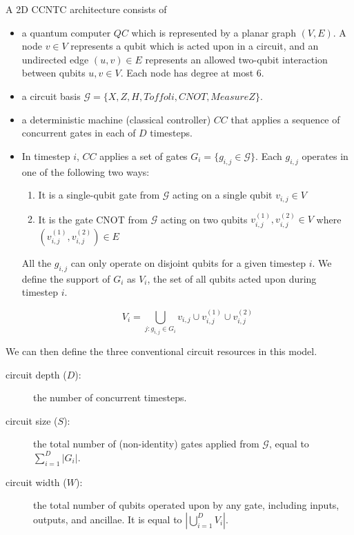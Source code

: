 \begin{definition}
A \textsf{2D CCNTC} architecture consists of

\begin{itemize}
\item a quantum computer $QC$ which is represented by a planar graph $(V,E)$. A
node $v \in V$ represents a qubit which is acted upon in a circuit, and an
undirected edge $(u,v) \in E$ represents 
an allowed two-qubit interaction between qubits $u,v \in V$. Each node has
degree at most $6$.
\item a circuit basis $\mathcal{G} = \{X, Z, H, Toffoli, CNOT, MeasureZ\}$.

\item a deterministic machine (classical controller) $CC$ that applies a sequence
of concurrent gates in each of $D$ timesteps.
\item In timestep $i$, $CC$ applies a set of
gates $G_i = \{g_{i,j} \in \mathcal{G} \}$.
Each $g_{i,j}$ operates in one of the following two ways:
\begin{enumerate}
\item It is a single-qubit gate from $\mathcal{G}$ acting on a single qubit $v_{i,j} \in V$
\item
It is the gate CNOT from $\mathcal{G}$ acting on two qubits $v^{(1)}_{i,j}, v^{(2)}_{i,j} \in V$ where
$\left(v^{(1)}_{i,j}, v^{(2)}_{i,j}\right) \in E$
\end{enumerate}
All the $g_{i,j}$ can only operate on
disjoint qubits for a given timestep $i$. We define the support of $G_i$
as $V_i$, the set of all qubits acted upon during timestep $i$.

\begin{equation}
V_i = \bigcup_{j: g_{i,j} \in G_i} v_{i,j} \cup v^{(1)}_{i,j} \cup v^{(2)}_{i,j}
\end{equation}

\end{itemize}
\end{definition}

We can then define the three conventional circuit resources in this model.

\begin{description}
\item[circuit depth ($D$):] the number of concurrent timesteps.
\item[circuit size ($S$):] the total number of (non-identity) gates applied
from $\mathcal{G}$, equal to $\sum_{i=1}^D |G_i|$.
\item[circuit width ($W$):] the total number of qubits operated upon by
any gate, including inputs, outputs, and ancillae. It is equal to $| \bigcup_{i=1}^D V_i|$.
\end{description}

